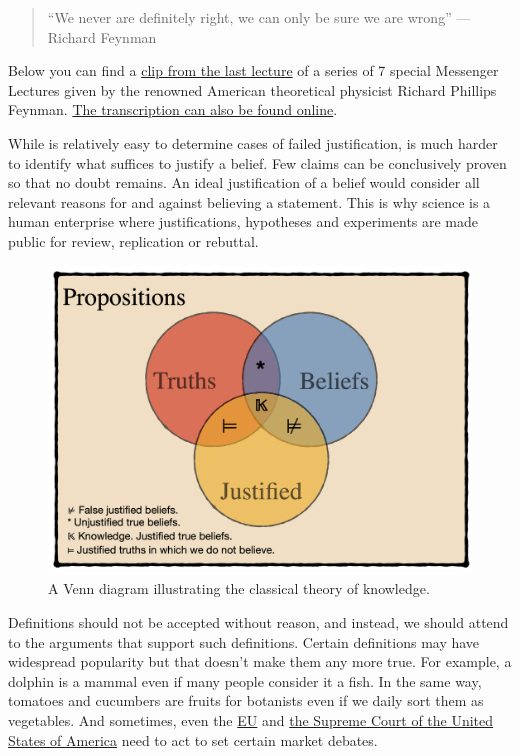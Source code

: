 \documentclass[
]{book}
\begin{document}
\begin{quote}
``We never are definitely right, we can only be sure we are wrong'' --- Richard Feynman
\end{quote}

Below you can find a \href{https://youtu.be/ECY-4Ng9Nkc?t=1190}{clip from the last lecture} of a series of 7 special Messenger Lectures given by the renowned American theoretical physicist Richard Phillips Feynman. \href{https://sites.google.com/site/barrykort/feynman-on-the-scientific-method}{The transcription can also be found online}.

While is relatively easy to determine cases of failed justification, is much harder to identify what suffices to justify a belief. Few claims can be conclusively proven so that no doubt remains. An ideal justification of a belief would consider all relevant reasons for and against believing a statement. This is why science is a human enterprise where justifications, hypotheses and experiments are made public for review, replication or rebuttal.

\begin{figure}

{\centering \includegraphics[width=1\linewidth]{Figures/knowledge} 

}

\caption{A Venn diagram illustrating the classical theory of knowledge.}\label{fig:plato-knowledge}
\end{figure}

Definitions should not be accepted without reason, and instead, we should attend to the arguments that support such definitions. Certain definitions may have widespread popularity but that doesn't make them any more true. For example, a dolphin is a mammal even if many people consider it a fish. In the same way, tomatoes and cucumbers are fruits for botanists even if we daily sort them as vegetables. And sometimes, even the \href{https://eur-lex.europa.eu/LexUriServ/LexUriServ.do?uri=CELEX:32001L0113:En:HTML\#d1e32-72-1}{EU} and \href{https://www.nationalgeographic.com/culture/article/fruit-or-vegetable}{the Supreme Court of the United States of America} need to act to set certain market debates.
\end{document}
